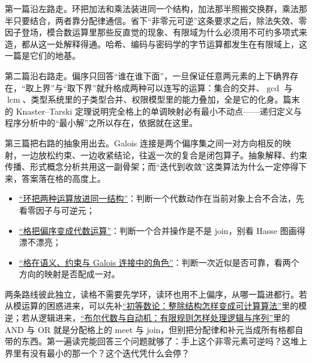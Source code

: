 第一篇沿左路走。环把加法和乘法装进同一个结构，加法那半照搬交换群，乘法那半只要结合，两者靠分配律通信。省下``非零元可逆''这条要求之后，除法失效、零因子登场，模合数运算里那些反直觉的现象、有限域为什么必须用不可约多项式来造，都从这一处解释得通。哈希、编码与密码学的字节运算都发生在有限域上，这一篇是它们的地基。

第二篇沿右路走。偏序只回答``谁在谁下面''，一旦保证任意两元素的上下确界存在，``取上界''与``取下界''就升格成两种可以连写的运算：集合的交并、\(\gcd\) 与 \(\operatorname{lcm}\)、类型系统里的子类型合并、权限模型里的能力叠加，全是它的化身。篇末的 Knaster--Tarski 定理说明完全格上的单调映射必有最小不动点——递归定义与程序分析中的``最小解''之所以存在，依据就在这里。

第三篇把右路的抽象用出去。Galois 连接是两个偏序集之间一对方向相反的映射，一边放松约束、一边收紧结论，往返一次的复合是闭包算子。抽象解释、约束传播、形式概念分析共用这一副骨架；而``迭代到收敛''这类算法为什么一定停得下来，答案落在格的高度上。

\begin{itemize}
\tightlist
\item \hyperref[sec:04-Discrete-Mathematics/08-Rings-and-Lattices/01]{``环把两种运算放进同一结构''}：判断一个代数动作在当前对象上合不合法，先看零因子与可逆元；
\item \hyperref[sec:04-Discrete-Mathematics/08-Rings-and-Lattices/02]{``格把偏序变成代数运算''}：判断一个合并操作是不是 join，别看 Hasse 图画得漂不漂亮；
\item \hyperref[sec:04-Discrete-Mathematics/08-Rings-and-Lattices/03]{``格在语义、约束与 Galois 连接中的角色''}：判断一次近似是否可靠，看两个方向的映射是否配成一对。
\end{itemize}

两条路线彼此独立，读格不需要先学环，读环也用不上偏序，从哪一篇进都行。若从模运算的困惑进来，可以先补\hyperref[ch:029]{``初等数论：整除结构怎样变成可计算算法''}里的模逆；若从逻辑进来，\hyperref[ch:033]{``布尔代数与自动机：有限规则怎样处理逻辑与序列''}里的 AND 与 OR 就是分配格上的 meet 与 join，但别把分配律和补元当成所有格都自带的东西。第一遍读完能回答三个问题就够了：手上这个非零元素可逆吗？这堆上界里有没有最小的那一个？这个迭代凭什么会停？
